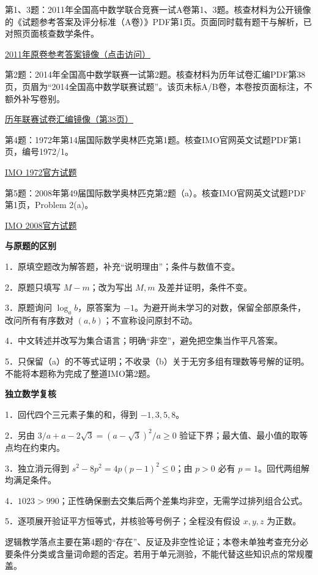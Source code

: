 \documentclass[UTF8,a4paper,11pt]{ctexart}
\begin{document}
第1、3题：2011年全国高中数学联合竞赛一试A卷第1、3题。核查材料为公开镜像的《试题参考答案及评分标准（A卷）》PDF第1页。页面同时载有题干与解析，已对照页面核查数学条件。
\par\href{https://oss.simiyun.cn/upload/20221115/9f38c37c8c914d33a3e7a04cded2efa7.pdf}{2011年原卷参考答案镜像（点击访问）}

第2题：2014年全国高中数学联赛一试第2题。核查材料为历年试卷汇编PDF第38页，页眉为“2014全国高中数学联赛试题”。该页未标A/B卷，本卷按页面标注，不额外补写卷别。
\par\href{https://7064135.s21i.faiusr.com/61/ABUIABA9GAAgr9Ko6gUo1-Prrgc.pdf}{历年联赛试卷汇编镜像（第38页）}

第4题：1972年第14届国际数学奥林匹克第1题。核查IMO官网英文试题PDF第1页，编号1972/1。
\par\href{https://www.imo-official.org/assets/documents/problems/1972/1972_eng.pdf}{IMO 1972官方试题}

第5题：2008年第49届国际数学奥林匹克第2题（a）。核查IMO官网英文试题PDF第1页，Problem 2(a)。
\par\href{https://www.imo-official.org/assets/documents/problems/2008/2008_eng.pdf}{IMO 2008官方试题}

\textbf{与原题的区别}
\par 1．原填空题改为解答题，补充“说明理由”；条件与数值不变。
\par 2．原题只填写 $M-m$；改为写出 $M,m$ 及差并证明，条件不变。
\par 3．原题询问 $\log_a b$，原答案为 $-1$。为避开尚未学习的对数，保留全部原条件，改问所有有序数对 $(a,b)$；不宣称设问原封不动。
\par 4．中文转述并改写为集合语言；明确“非空”，避免把空集当作平凡答案。
\par 5．只保留（a）的不等式证明；不收录（b）关于无穷多组有理数等号解的证明。不能将本题称为完成了整道IMO第2题。

\textbf{独立数学复核}
\par 1．回代四个三元素子集的和，得到 $-1,3,5,8$。
\par 2．另由 $3/a+a-2\sqrt3=(a-\sqrt3)^2/a\ge0$ 验证下界；最大值、最小值的取等点均在约束内。
\par 3．独立消元得到 $s^2-8p^2=4p(p-1)^2\le0$；由 $p>0$ 必有 $p=1$。回代两组解均满足条件。
\par 4．$1023>990$；正性确保删去交集后两个差集均非空，无需学过排列组合公式。
\par 5．逐项展开验证平方恒等式，并核验等号例子；全程没有假设 $x,y,z$ 为正数。

逻辑教学落点主要在第4题的“存在”、反证及非空性论证；本卷未单独考查充分必要条件分类或含量词命题的否定。若用于单元测验，不能代替这些知识点的常规覆盖。
\end{document}
